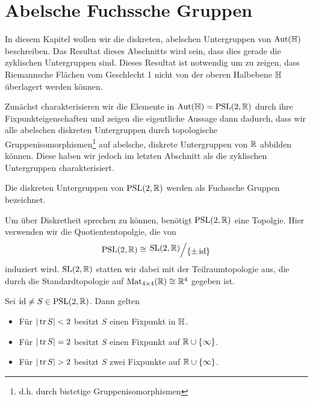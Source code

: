 
\section{Abelsche Fuchssche Gruppen}
\label{sec:fuchs}

In diesem Kapitel wollen wir die diskreten, abelschen Untergruppen von
$\operatorname{Aut}(\mathbb{H})$ beschreiben. Das Resultat dieses Abschnitts wird sein, dass
dies gerade die zyklischen Untergruppen sind. Dieses Resultat ist
notwendig um zu zeigen, dass Riemannsche Flächen vom Geschlecht 1
nicht von der oberen Halbebene $\mathbb{H}$ überlagert werden können.

Zunächst charakterisieren wir die Elemente in $\operatorname{Aut}(\mathbb{H}) = \operatorname{PSL}(2, \mathbb{R})$
durch ihre Fixpunkteigenschaften und zeigen die eigentliche Aussage
dann dadurch, dass wir alle abelschen diskreten Untergruppen durch
topologische Gruppenisomorphismen\footnote{d.h. durch bistetige
  Gruppenisomorphismen} auf abelsche, diskrete Untergruppen
von $\mathbb{R}$ abbilden können. Diese haben wir jedoch im letzten Abschnitt
als die zyklischen Untergruppen charakterisiert.

\begin{defin}
  Die diskreten Untergruppen von $\operatorname{PSL}(2,\mathbb{R})$ werden als Fuchssche
  Gruppen bezeichnet.
\end{defin}

\begin{rem}
  Um über Diskretheit sprechen zu können, benötigt $\operatorname{PSL}(2, \mathbb{R})$
  eine Topolgie. Hier verwenden wir die Quotiententopolgie, die von
  \[
  \PSL(2, \R) \cong \quot{\SL(2, \R)}{\{\pm \id\}}
  \]
  induziert wird. $\operatorname{SL}(2, \mathbb{R})$ statten wir dabei mit der
  Teilraumtopologie aus, die durch die Standardtopologie auf
  $\operatorname{Mat}_{4\times4}(\mathbb{R}) \cong \mathbb{R}^4$ gegeben ist.
\end{rem}

\begin{thm}
  \label{thm:fixpkt}
  Sei $\operatorname{id} \neq S \in \operatorname{PSL}(2, \mathbb{R})$. Dann gelten
  \begin{itemize}
  \item Für $|\operatorname{tr} S| < 2$ besitzt $S$ einen Fixpunkt in $\mathbb{H}$.
  \item Für $|\operatorname{tr} S| = 2$ besitzt $S$ einen Fixpunkt auf $\mathbb{R} \cup \{\infty\}$.
  \item Für $|\operatorname{tr} S| > 2$ besitzt $S$ zwei Fixpunkte auf $\mathbb{R} \cup \{\infty\}$.
  \end{itemize}
\end{thm}

